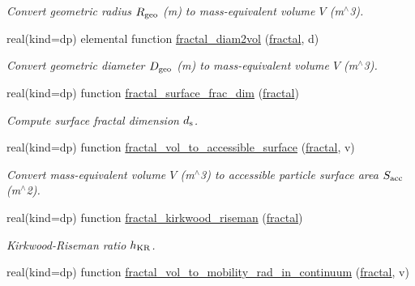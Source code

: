 \begin{DoxyCompactItemize}
\begin{DoxyCompactList}\small\item\em Convert geometric radius $R_{\rm geo}$ (m) to mass-\/equivalent volume $V$ (m$^\wedge$3). \end{DoxyCompactList}\item 
real(kind=dp) elemental function \mbox{\hyperlink{namespacepmc__fractal_a13aa17ef43c83973948ac8b325c0997b}{fractal\+\_\+diam2vol}} (\mbox{\hyperlink{fractal_8_f90_a949ba7f6f3ce672ed686152acedb28bf}{fractal}}, d)
\begin{DoxyCompactList}\small\item\em Convert geometric diameter $D_{\rm geo}$ (m) to mass-\/equivalent volume $V$ (m$^\wedge$3). \end{DoxyCompactList}\item 
real(kind=dp) function \mbox{\hyperlink{namespacepmc__fractal_a66e1a24bcccb137795eed54c89d39254}{fractal\+\_\+surface\+\_\+frac\+\_\+dim}} (\mbox{\hyperlink{fractal_8_f90_a949ba7f6f3ce672ed686152acedb28bf}{fractal}})
\begin{DoxyCompactList}\small\item\em Compute surface fractal dimension $d_{\rm s}$. \end{DoxyCompactList}\item 
real(kind=dp) function \mbox{\hyperlink{namespacepmc__fractal_a93eab681116d46a9ed91306e99f00840}{fractal\+\_\+vol\+\_\+to\+\_\+accessible\+\_\+surface}} (\mbox{\hyperlink{fractal_8_f90_a949ba7f6f3ce672ed686152acedb28bf}{fractal}}, v)
\begin{DoxyCompactList}\small\item\em Convert mass-\/equivalent volume $V$ (m$^\wedge$3) to accessible particle surface area $S_{\rm acc}$ (m$^\wedge$2). \end{DoxyCompactList}\item 
real(kind=dp) function \mbox{\hyperlink{namespacepmc__fractal_a0124f3a93e7460e0f6889c214040ed54}{fractal\+\_\+kirkwood\+\_\+riseman}} (\mbox{\hyperlink{fractal_8_f90_a949ba7f6f3ce672ed686152acedb28bf}{fractal}})
\begin{DoxyCompactList}\small\item\em Kirkwood-\/\+Riseman ratio $h_{\rm KR}$. \end{DoxyCompactList}\item 
real(kind=dp) function \mbox{\hyperlink{namespacepmc__fractal_a733d4d05da2a7640c7d9af5ed2bda824}{fractal\+\_\+vol\+\_\+to\+\_\+mobility\+\_\+rad\+\_\+in\+\_\+continuum}} (\mbox{\hyperlink{fractal_8_f90_a949ba7f6f3ce672ed686152acedb28bf}{fractal}}, v)

\end{DoxyCompactItemize}
